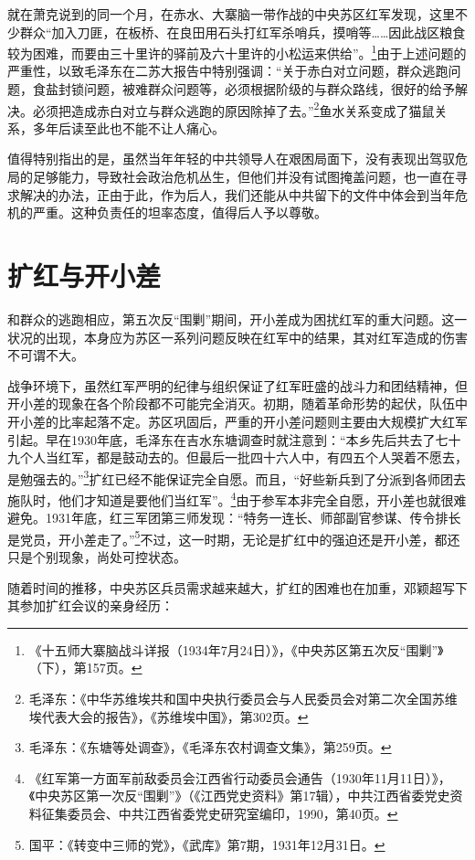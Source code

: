就在萧克说到的同一个月，在赤水、大寨脑一带作战的中央苏区红军发现，这里不少群众“加入刀匪，在板桥、在良田用石头打红军杀哨兵，摸哨等……因此战区粮食较为困难，而要由三十里许的驿前及六十里许的小松运来供给”。\footnote{《十五师大寨脑战斗详报（1934年7月24日）》，《中央苏区第五次反“围剿”》（下），第157页。}由于上述问题的严重性，以致毛泽东在二苏大报告中特别强调：“关于赤白对立问题，群众逃跑问题，食盐封锁问题，被难群众问题等，必须根据阶级的与群众路线，很好的给予解决。必须把造成赤白对立与群众逃跑的原因除掉了去。”\footnote{毛泽东：《中华苏维埃共和国中央执行委员会与人民委员会对第二次全国苏维埃代表大会的报告》，《苏维埃中国》，第302页。}鱼水关系变成了猫鼠关系，多年后读至此也不能不让人痛心。


值得特别指出的是，虽然当年年轻的中共领导人在艰困局面下，没有表现出驾驭危局的足够能力，导致社会政治危机丛生，但他们并没有试图掩盖问题，也一直在寻求解决的办法，正由于此，作为后人，我们还能从中共留下的文件中体会到当年危机的严重。这种负责任的坦率态度，值得后人予以尊敬。

\section{扩红与开小差}


和群众的逃跑相应，第五次反“围剿”期间，开小差成为困扰红军的重大问题。这一状况的出现，本身应为苏区一系列问题反映在红军中的结果，其对红军造成的伤害不可谓不大。


战争环境下，虽然红军严明的纪律与组织保证了红军旺盛的战斗力和团结精神，但开小差的现象在各个阶段都不可能完全消灭。初期，随着革命形势的起伏，队伍中开小差的比率起落不定。苏区巩固后，严重的开小差问题则主要由大规模扩大红军引起。早在1930年底，毛泽东在吉水东塘调查时就注意到：“本乡先后共去了七十九个人当红军，都是鼓动去的。但最后一批四十六人中，有四五个人哭着不愿去，是勉强去的。”\footnote{毛泽东：《东塘等处调查》，《毛泽东农村调查文集》，第259页。}扩红已经不能保证完全自愿。而且，“好些新兵到了分派到各师团去施队时，他们才知道是要他们当红军”。\footnote{《红军第一方面军前敌委员会江西省行动委员会通告（1930年11月11日）》，《中央苏区第一次反“围剿”》（《江西党史资料》第17辑），中共江西省委党史资料征集委员会、中共江西省委党史研究室编印，1990，第40页。}由于参军本非完全自愿，开小差也就很难避免。1931年底，红三军团第三师发现：“特务一连长、师部副官参谋、传令排长是党员，开小差走了。”\footnote{国平：《转变中三师的党》，《武库》第7期，1931年12月31日。}不过，这一时期，无论是扩红中的强迫还是开小差，都还只是个别现象，尚处可控状态。


随着时间的推移，中央苏区兵员需求越来越大，扩红的困难也在加重，邓颖超写下其参加扩红会议的亲身经历：

